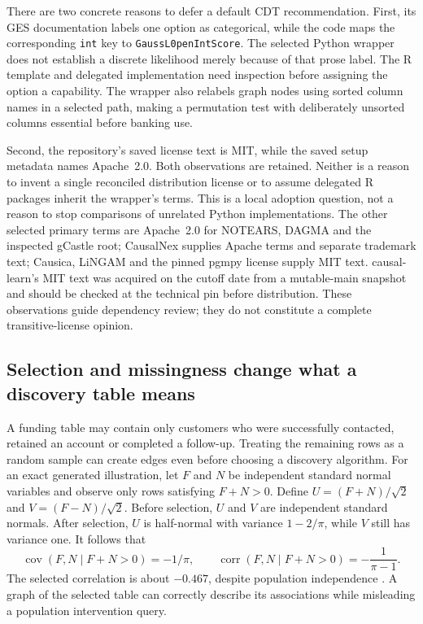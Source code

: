 There are two concrete reasons to defer a default CDT recommendation. First,
its GES documentation labels one option as categorical, while the code maps
the corresponding \texttt{int} key to \texttt{GaussL0penIntScore}. The selected
Python wrapper does not establish a discrete likelihood merely because of
that prose label. The R template and delegated implementation need inspection
before assigning the option a capability. The wrapper also relabels graph
nodes using sorted column names in a selected path, making a permutation test
with deliberately unsorted columns essential before banking use.

Second, the repository's saved license text is MIT, while the saved setup
metadata names Apache~2.0. Both observations are retained. Neither is a reason
to invent a single reconciled distribution license or to assume delegated
R packages inherit the wrapper's terms. This is a local adoption question,
not a reason to stop comparisons of unrelated Python implementations. The
other selected primary terms are Apache~2.0 for NOTEARS, DAGMA and the inspected
gCastle root; CausalNex supplies Apache terms and separate trademark text;
Causica, LiNGAM and the pinned pgmpy license supply MIT text. causal-learn's
MIT text was acquired on the cutoff date from a mutable-main snapshot and
should be checked at the technical pin before distribution. These observations
guide dependency review; they do not constitute a complete transitive-license
opinion.

\subsection{Selection and missingness change what a discovery table means}

A funding table may contain only customers who were successfully contacted,
retained an account or completed a follow-up. Treating the remaining rows as a
random sample can create edges even before choosing a discovery algorithm.
For an exact generated illustration, let \(F\) and \(N\) be independent
standard normal variables and observe only rows satisfying \(F+N>0\). Define
\(U=(F+N)/\sqrt2\) and \(V=(F-N)/\sqrt2\). Before selection, \(U\) and \(V\)
are independent standard normals. After selection, \(U\) is half-normal with
variance \(1-2/\pi\), while \(V\) still has variance one. It follows that
\begin{equation}
 \operatorname{cov}(F,N\mid F+N>0)=-1/\pi,\qquad
 \operatorname{corr}(F,N\mid F+N>0)=-\frac1{\pi-1}.
\end{equation}
The selected correlation is about \(-0.467\), despite population independence
\citep{exec13_pydisc_examples}. A graph of the selected table can correctly
describe its associations while misleading a population intervention query.

